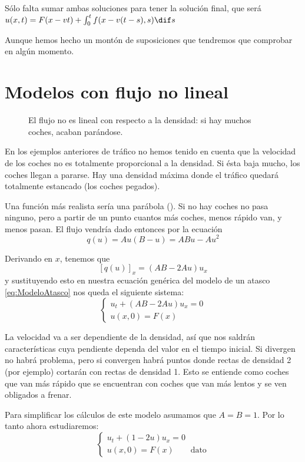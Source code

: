 			Sólo falta sumar ambas soluciones para tener la solución final, que será \(
			u(x,t) = F(x-vt) + \int_0^t f(x-v(t-s),s) \dif s \label{eq:SolDuhamel} \)

			Aunque hemos hecho un montón de suposiciones que tendremos que comprobar en algún momento.

	\section{Modelos con flujo no lineal}
	\label{sec:ModeloTraficoRealista}

		\begin{wrapfigure}{R}{0.4\textwidth}
			\centering
			\vspace{-15pt}
			\caption{El flujo no es lineal con respecto a la densidad: si hay muchos coches, acaban parándose.}
			\label{fig:parabola}
		\end{wrapfigure}

		En los ejemplos anteriores de tráfico no hemos tenido en cuenta que la velocidad de los coches no es totalmente proporcional a la densidad. Si ésta baja mucho, los coches llegan a pararse. Hay una densidad máxima donde el tráfico quedará totalmente estancado (los coches pegados).

		Una función más realista sería una parábola (). Si no hay coches no pasa ninguno, pero a partir de un punto cuantos más coches, menos rápido van, y menos pasan. El flujo vendría dado entonces por la ecuación \[
		q(u) = Au (B-u) = ABu - Au^{2} \]

		Derivando en $x$, tenemos que \[ [q(u)]_x = (AB - 2Au) u_x\] y sustituyendo esto en nuestra ecuación genérica del modelo de un atasco \eqref{eq:ModeloAtasco} nos queda el siguiente sistema: \[ \begin{cases}
		u_t + (AB - 2Au) u_x = 0 \\ u(x,0) = F(x)\end{cases}\]

		La velocidad va a ser dependiente de la densidad, así que nos saldrán características cuya pendiente dependa del valor en el tiempo inicial. Si divergen no habrá problema, pero si convergen habrá puntos donde rectas de densidad 2 (por ejemplo) cortarán con rectas de densidad 1. Esto se entiende como coches que van más rápido que se encuentran con coches que van más lentos y se ven obligados a frenar.

		Para simplificar los cálculos de este modelo asumamos que $A = B = 1$. Por lo tanto ahora estudiaremos:
		\begin{equation*}
			\left\{
			\begin{array}{l}
				u_t + (1-2u)u_{x} = 0 \\
				u(x, 0) = F(x) \quad \quad \text{dato}
			\end{array}
			\right.
		\end{equation*}

